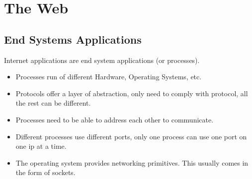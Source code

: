 \chapter{The Web}

\section{End Systems Applications}
Internet applications are end system applications (or processes).
\begin{itemize}
    \setlength\itemsep{0em}
    \item Processes run of different Hardware, Operating Systems, etc.
    \item Protocols offer a layer of abstraction, only need to comply with protocol, all the rest can be different.
    \item Processes need to be able to address each other to communicate.
    \item Different processes use different ports, only one process can use one port on one ip at a time.
    \item The operating system provides networking primitives. This usually comes in the form of sockets.
\end{itemize}

